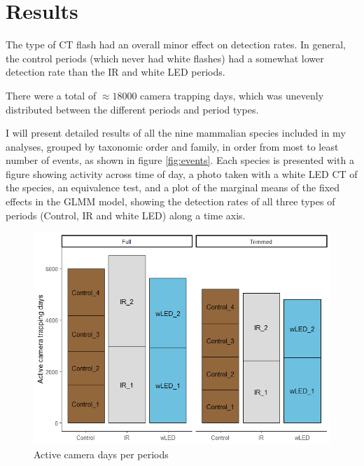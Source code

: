 \chapter{Results}


The type of CT flash had an overall minor effect on detection rates.
In general, the control periods (which never had white flashes) had a somewhat lower detection rate than the IR and white LED periods.

There were a total of $\approx 18 000$ camera trapping days, which was unevenly distributed between the different periods and period types.




I will present detailed results of all the nine mammalian species included in my analyses, grouped by taxonomic order and family, in order from most to least number of events, as shown in figure \ref{fig:events}.
Each species is presented with a figure showing activity across time of day, a photo taken with a white LED CT of the species, %
an equivalence test, and a plot of the marginal means of the fixed effects in the GLMM model, showing the detection rates of all three types of periods (Control, IR and white LED) along a time axis.


\begin{figure}[h]
\includegraphics[width=0.9\linewidth]{../R/glmm_sp_files/figure-html/active-days-3.png} 
	\caption{Active camera days per periods}
	\label{fig:active days}
\end{figure}


